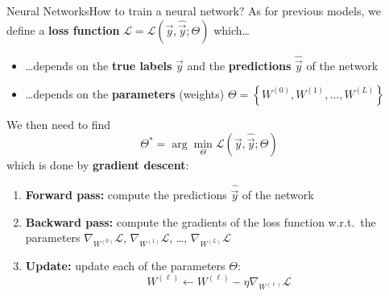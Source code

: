 \begin{frame}{Neural Networks}{How to train a neural network?}
    As for previous models, we define a \textbf{loss function} $\mathcal{L} = \mathcal{L}(\vec{y}, \hat{\vec{y}}; \Theta)$ which\dots
    \begin{itemize}
        \item<2-> \dots depends on the \textbf{true labels} $\vec{y}$ and the \textbf{predictions} $\hat{\vec{y}}$ of the network
        \item<3-> \dots depends on the \textbf{parameters} (weights) $\Theta = \left\{ W^{(0)}, W^{(1)}, \dots, W^{(L)} \right\}$
    \end{itemize}

    \vfill \pause

    We then need to find $$\Theta^* = \arg\min_{\Theta} \mathcal{L}(\vec{y}, \hat{\vec{y}}; \Theta)$$
    which is done by \textbf{gradient descent}:
    \begin{enumerate}
        \item<4-> \textbf{Forward pass:} compute the predictions $\hat{\vec{y}}$ of the network
        \item<5-> \textbf{Backward pass:} compute the gradients of the loss function w.r.t.\ the parameters $\nabla_{W^{(0)}} \mathcal{L}$, $\nabla_{W^{(1)}} \mathcal{L}$, \dots, $\nabla_{W^{(L)}} \mathcal{L}$
        \item<6-> \textbf{Update:} update each of the parameters $\Theta$: $$W^{(\ell)} \gets W^{(\ell)} - \eta \nabla_{W^{(\ell)}} \mathcal{L}$$
    \end{enumerate}
\end{frame}

